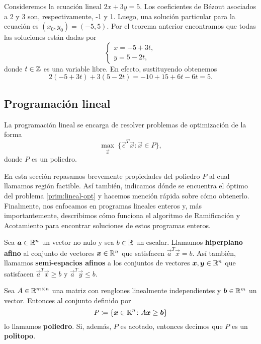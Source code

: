 \begin{example}
	Consideremos la ecuación lineal $2x + 3y = 5$. Los coeficientes de Bézout asociados a 2 y 3 son,
	respectivamente, -1 y 1. Luego, una solución particular para la ecuación es $(x_0, y_0) = (-5, 5)$.
	Por el teorema anterior encontramos que todas las soluciones están dadas por
	\begin{equation*}
		\begin{cases}
			x = -5 + 3t, \\
			y = 5 - 2t,
		\end{cases}
	\end{equation*}
	donde $t \in \mathbb{Z}$ es una variable libre. En efecto, sustituyendo obtenemos
	\begin{equation*}
		2(-5 + 3t) + 3(5 - 2t) = -10 + 15 + 6t - 6t = 5.
	\end{equation*}
\end{example}

\subsection{Programación lineal}
\label{subsec:lp}
\noindent
La programación lineal se encarga de resolver problemas de optimización de la forma
\begin{equation}
	\label{prim:lineal-opt}
	\max_{\vec{x}} ~\lbrace \vec{c}^T\vec{x} \colon \vec{x} \in P \rbrace,
\end{equation}
donde $P$ es un poliedro.

En esta sección repasamos brevemente propiedades del poliedro $P$ al cual llamamos región factible.
Así también, indicamos dónde se encuentra el óptimo del problema \eqref{prim:lineal-opt} y hacemos
mención rápida sobre cómo obtenerlo. Finalmente, nos enfocamos en programas lineales enteros y, más
importantemente, describimos cómo funciona el algoritmo de Ramificación y Acotamiento para encontrar
soluciones de estos programas enteros.

\begin{definition}
	Sea $\boldsymbol{a} \in \mathbb{R}^n$ un vector no nulo y sea $b \in \mathbb{R}$ un escalar. Llamamos
	\textbf{hiperplano afino}
	al conjunto de vectores $\boldsymbol{x} \in \mathbb{R}^n$ que satisfacen $\vec{a}^T\vec{x} = b$. Así también,
	llamamos \textbf{semi-espacios afinos} a los conjuntos de vectores $\boldsymbol{x}, \boldsymbol{y} \in \mathbb{R}^n$ que
	satisfacen $\vec{a}^T\vec{x} \geq b$ y $\vec{a}^T\vec{y} \leq b$.
\end{definition}

\begin{definition}
	Sea $A \in \mathbb{R}^{m \times n}$ una matriz con renglones linealmente independientes y $\boldsymbol{b} \in
	\mathbb{R}^m$ un vector. Entonces al conjunto definido por
	\begin{equation}
		\label{prerreq:def:poly}
		P \coloneq \lbrace \boldsymbol{x} \in \mathbb{R}^n \colon A\boldsymbol{x} \geq \boldsymbol{b} \rbrace
	\end{equation}
	lo llamamos \textbf{poliedro}. Si, además, $P$ es acotado, entonces decimos que $P$ es un
	\textbf{politopo}.
\end{definition}

